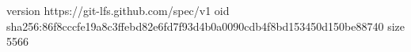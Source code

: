 version https://git-lfs.github.com/spec/v1
oid sha256:86f8cccfe19a8c3ffebd82e6fd7f93d4b0a0090cdb4f8bd153450d150be88740
size 5566
